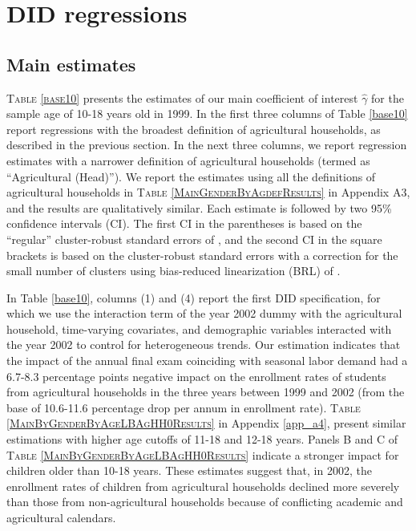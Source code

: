 \documentclass[12pt,letterpaper]{article}
\newcommand{\0}{\ensuremath{\mbox{\boldmath $0$}}}
\begin{document}
\section{DID regressions}\label{sec_DID}
\subsection{Main estimates}

\textsc{\small Table \ref{base10}} presents the estimates of our main coefficient of interest $\hat{\gamma}$ for the sample age of 10-18 years old in 1999. In the first three columns of Table \ref{base10} report regressions with the broadest definition of agricultural households, as described in the previous section. In the next three columns, we report regression estimates with a narrower definition of agricultural households (termed as ``Agricultural (Head)''). We report the estimates using all the definitions of agricultural households in \textsc{Table \ref{MainGenderByAgdefResults}} in Appendix A3, and the results are qualitatively similar. Each estimate is followed by two 95\% confidence intervals (CI). The first CI in the parentheses is based on the ``regular'' cluster-robust standard errors of \citet{liang1986longitudinal}, and the second CI in the square brackets is based on the cluster-robust standard errors with a correction for the small number of clusters using bias-reduced linearization (BRL) of \citet{PustejovskyTipton2018}.

In Table \ref{base10}, columns (1) and (4) report the first DID specification, for which we use the interaction term of the year 2002 dummy with the agricultural household, time-varying covariates, and demographic variables interacted with the year 2002 to control for heterogeneous trends.
Our estimation indicates that the impact of the annual final exam coinciding with seasonal labor demand had a 6.7-8.3 percentage points negative impact on the enrollment rates of students from agricultural households in the three years between 1999 and 2002 (from the base of  10.6-11.6 percentage drop per annum in enrollment rate). \textsc{\small Table \ref{MainByGenderByAgeLBAgHH0Results}} in Appendix \ref{app_a4}, present similar estimations with higher age cutoffs of 11-18 and 12-18 years. Panels B and C of \textsc{Table \ref{MainByGenderByAgeLBAgHH0Results}} indicate a stronger impact for children older than 10-18 years. These estimates suggest that, in 2002, the enrollment rates of children from agricultural households declined more severely than those from non-agricultural households because of conflicting academic and agricultural calendars.
\end{document}
